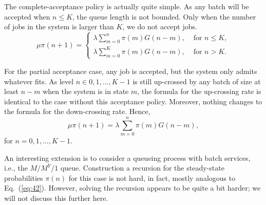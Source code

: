 \begin{exercise}[\faPhoto]
\begin{solution}
  The complete-acceptance policy is actually quite simple. As any
  batch will be accepted when $n\leq K$, the queue length is not
  bounded.  Only when the number of jobs in the system is larger than
  $K$, we do not accept jobs. 
  \begin{equation*}
    \mu \pi(n+1) = 
    \begin{cases}
      \lambda \sum_{m=0}^n \pi(m) G(n-m), & \text{ for } n\leq K,\\
      \lambda \sum_{m=0}^K \pi(m) G(n-m), & \text{ for } n> K.
    \end{cases}
  \end{equation*}





  For the partial acceptance case, any job is accepted, but the system
  only admits whatever fits.  As level $n\in {0,1,...,K-1}$ is still up-crossed by any batch of size at least $n-m$ when the system is in state $m$, the formula for the up-crossing rate is identical to the case without this acceptance policy. Moreover, nothing changes to the formula for the down-crossing rate. Hence, 
  \begin{equation*}
    \mu \pi(n+1) = \lambda \sum_{m=0}^n \pi(m) G(n-m), 
  \end{equation*}
  for $n=0,1,\ldots, K-1$. 
\end{solution}
\end{exercise}


\begin{exercise}[\faRocket]
An interesting extension is to consider a queueing process with batch
services, i.e., the $M/M^Y/1$ queue. Construction a recursion for the
steady-state probabilities $\pi(n)$ for this case is not hard, in fact,
mostly analogous to Eq.~(\ref{eq:42}).  However, solving the recursion
appears to be quite a bit harder; we will not discuss this further here.
\end{exercise}





